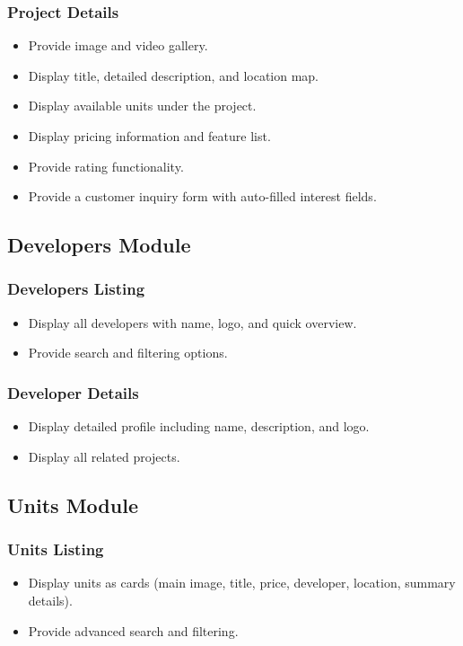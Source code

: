 \documentclass[12pt]{article}
\begin{document}
\subsubsection{Project Details}
\begin{itemize}
    \item Provide image and video gallery.
    \item Display title, detailed description, and location map.
    \item Display available units under the project.
    \item Display pricing information and feature list.
    \item Provide rating functionality.
    \item Provide a customer inquiry form with auto-filled interest fields.
\end{itemize}

\subsection{Developers Module}

\subsubsection{Developers Listing}
\begin{itemize}
    \item Display all developers with name, logo, and quick overview.
    \item Provide search and filtering options.
\end{itemize}

\subsubsection{Developer Details}
\begin{itemize}
    \item Display detailed profile including name, description, and logo.
    \item Display all related projects.
\end{itemize}

\subsection{Units Module}

\subsubsection{Units Listing}
\begin{itemize}
    \item Display units as cards (main image, title, price, developer, location, summary details).
    \item Provide advanced search and filtering.
\end{itemize}
\end{document}
